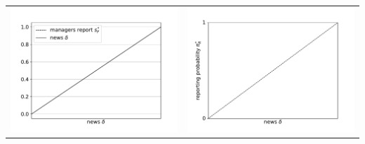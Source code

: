 \documentclass{article}
\begin{document}
\begin{tabular}{cc}
	\includegraphics[scale=.5]{news_managers_report_news} & \includegraphics[scale=.5]{news_reporting_probability} \\

\end{tabular}
\end{document}
